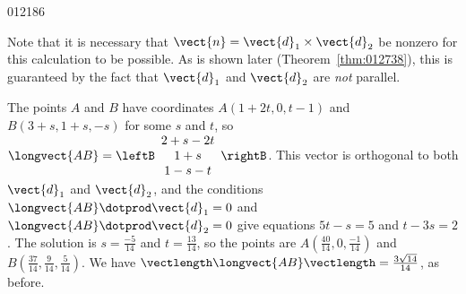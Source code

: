 \begin{example}{}{012186}
\begin{solution}
Note that it is necessary that $\vect{n} = \vect{d}_{1} \times \vect{d}_{2}$ be nonzero for this calculation to be possible. As is shown later (Theorem~\ref{thm:012738}), this is guaranteed by the fact that $\vect{d}_{1}$ and $\vect{d}_{2}$ are \textit{not} parallel.


The points $A$ and $B$ have coordinates $A(1 + 2t, 0, t - 1)$ and $B(3 + s, 1 + s, -s)$ for some $s$ and $t$, so $\longvect{AB} = \leftB
\begin{array}{c}
2 + s - 2t\\
1 + s\\
1 - s - t
\end{array}
\rightB$. This vector is orthogonal to both $\vect{d}_{1}$ and $\vect{d}_{2}$, and the conditions $\longvect{AB} \dotprod \vect{d}_{1} = 0$ and $\longvect{AB} \dotprod \vect{d}_{2} = 0$ give equations $5t - s = 5$ and $t -3s = 2$. The solution is $s = \frac{-5}{14}$
 and $t = \frac{13}{14}$, so the points are $A(\frac{40}{14}, 0, \frac{-1}{14})$ and $B(\frac{37}{14}, \frac{9}{14}, \frac{5}{14})$. We have $\vectlength \longvect{AB} \vectlength = \frac{3\sqrt{14}}{14}$, as before.
\end{solution}
\end{example}

